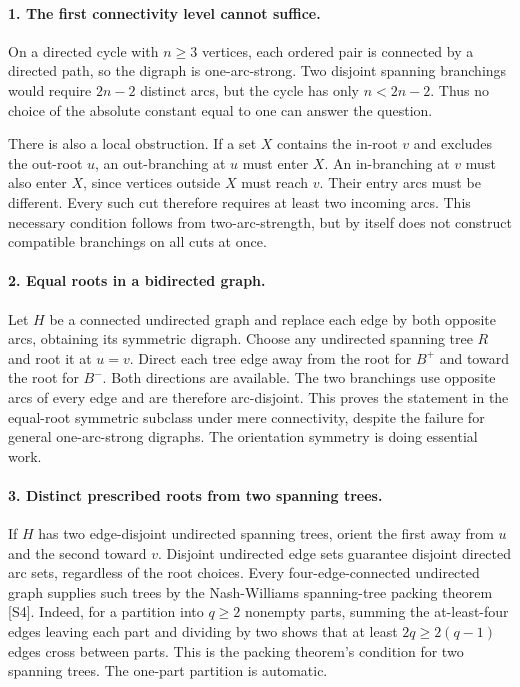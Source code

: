 \documentclass[11pt,a4paper]{article}
\begin{document}
\paragraph{1. The first connectivity level cannot suffice.}
On a directed cycle with $n\ge3$ vertices, each ordered pair is
connected by a directed path, so the digraph is one-arc-strong.
Two disjoint spanning branchings would require $2n-2$ distinct arcs,
but the cycle has only $n<2n-2$. Thus no choice of the absolute
constant equal to one can answer the question.

There is also a local obstruction. If a set $X$ contains the in-root
$v$ and excludes the out-root $u$, an out-branching at $u$ must enter
$X$. An in-branching at $v$ must also enter $X$, since vertices outside
$X$ must reach $v$. Their entry arcs must be different. Every such
cut therefore requires at least two incoming arcs. This necessary
condition follows from two-arc-strength, but by itself does not
construct compatible branchings on all cuts at once.

\paragraph{2. Equal roots in a bidirected graph.}
Let $H$ be a connected undirected graph and replace each edge by
both opposite arcs, obtaining its symmetric digraph. Choose any
undirected spanning tree $R$ and root it at $u=v$. Direct each tree
edge away from the root for $B^+$ and toward the root for $B^-$.
Both directions are available. The two branchings use opposite arcs
of every edge and are therefore arc-disjoint. This proves the
statement in the equal-root symmetric subclass under mere
connectivity, despite the failure for general one-arc-strong digraphs.
The orientation symmetry is doing essential work.

\paragraph{3. Distinct prescribed roots from two spanning trees.}
If $H$ has two edge-disjoint undirected spanning trees, orient the
first away from $u$ and the second toward $v$. Disjoint undirected
edge sets guarantee disjoint directed arc sets, regardless of the
root choices. Every four-edge-connected undirected graph supplies
such trees by the Nash-Williams spanning-tree packing theorem [S4].
Indeed, for a partition into $q\ge2$ nonempty parts, summing the
at-least-four edges leaving each part and dividing by two shows
that at least $2q\ge2(q-1)$ edges cross between parts. This is the
packing theorem's condition for two spanning trees. The one-part
partition is automatic.
\end{document}
